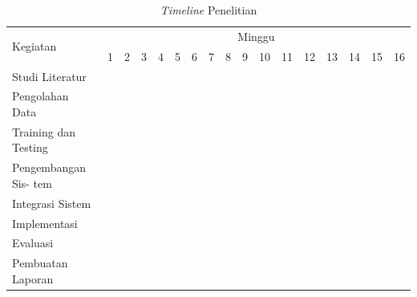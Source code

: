 \newcommand{\w}{}
\newcommand{\G}{\cellcolor{gray}}
\begin{table}[h!]
  \caption{\emph{Timeline} Penelitian}
  \label{tb:timeline}

  \begin{tabular}{|p{3.5cm}|c|c|c|c|c|c|c|c|c|c|c|c|c|c|c|c|}
    \hline
    \multirow{2}{*}{Kegiatan} & \multicolumn{16}{|c|}{Minggu}                                                                       \\
    \cline{2-17}              &
    1                         & 2                             & 3  & 4  & 5  & 6  & 7  & 8  & 9  & 10 & 11 & 12 & 13 & 14 & 15 & 16 \\
    \hline

    Studi Literatur           &
    \G                        & \G                            & \G & \G & \w & \w & \w & \w & \w & \w & \w & \w & \w & \w & \w & \w \\
    \hline

    Pengolahan Data           &
    \w                        & \w                            & \G & \G & \G & \G & \w & \w & \w & \w & \w & \w & \w & \w & \w & \w \\
    \hline

    Training dan Testing      &
    \w                        & \w                            & \w & \w & \w & \G & \G & \G & \G & \w & \w & \w & \w & \w & \w & \w \\
    \hline

    Pengembangan Sis- tem     &
    \w                        & \w                            & \w & \w & \G & \G & \G & \G & \G & \w & \w & \w & \w & \w & \w & \w \\
    \hline

    Integrasi Sistem          &
    \w                        & \w                            & \w & \w & \w & \w & \w & \w & \w & \G & \G & \w & \w & \w & \w & \w \\
    \hline

    Implementasi              &
    \w                        & \w                            & \w & \w & \w & \w & \w & \w & \w & \w & \w & \G & \G & \G & \G & \w \\
    \hline

    Evaluasi                  &
    \w                        & \w                            & \w & \w & \w & \w & \w & \w & \w & \w & \w & \w & \w & \w & \G & \G \\
    \hline

    Pembuatan Laporan         &
    \G                        & \G                            & \G & \G & \G & \G & \G & \G & \G & \G & \G & \G & \G & \G & \G & \G \\
    \hline
  \end{tabular}
\end{table}